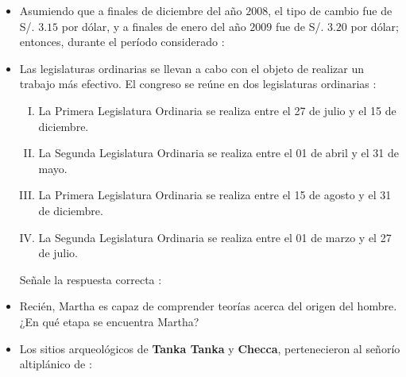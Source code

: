 \documentclass[10pt, twocolumn, landscape, a4paper]{article}
\begin{document}
\begin{itemize}
{\begin{tasks}
\end{tasks}}
\item{Asumiendo que a finales de diciembre del año $2008$, el tipo de cambio fue de S/. $3.15$ por dólar, y a finales de enero del año $2009$ fue de S/. $3.20$ por dólar; entonces, durante el período considerado :
\begin{tasks}
\end{tasks}}
\item{Las legislaturas ordinarias se llevan a cabo con el objeto de realizar un trabajo más efectivo. El congreso se reúne en dos legislaturas ordinarias :
\begin{enumerate}[I. ]
\item{La Primera Legislatura Ordinaria se realiza entre el 27 de julio y el 15 de diciembre.}
\item{La Segunda Legislatura Ordinaria se realiza entre el 01 de abril y el 31 de mayo.}
\item{La Primera Legislatura Ordinaria se realiza entre el 15 de agosto y el 31 de diciembre.}
\item{La Segunda Legislatura Ordinaria se realiza entre el 01 de marzo y el 27 de julio.}
\end{enumerate}
Señale la respuesta correcta :
\begin{tasks}
\end{tasks}}
\item{Recién, Martha es capaz de comprender teorías acerca del origen del hombre. ¿En qué etapa se encuentra Martha?
\begin{tasks}
\end{tasks}}
\item{Los sitios arqueológicos de \textbf{Tanka Tanka} y \textbf{Checca}, pertenecieron al señorío altiplánico de :
\begin{tasks}
\end{tasks}}

\end{itemize}
\end{document}
